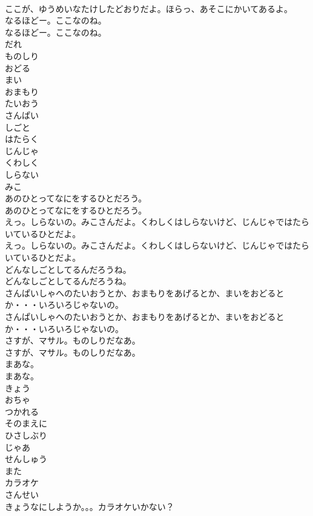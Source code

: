 \documentclass[8pt]{extreport}
\begin{document}
\begin{CJK}{UTF8}{min}
\\	ここが、ゆうめいなたけしたどおりだよ。ほらっ、あそこにかいてあるよ。
\\	なるほどー。ここなのね。
\\	なるほどー。ここなのね。
\\	だれ
\\	ものしり
\\	おどる
\\	まい
\\	おまもり
\\	たいおう
\\	さんぱい
\\	しごと
\\	はたらく
\\	じんじゃ
\\	くわしく
\\	しらない
\\	みこ
\\	あのひとってなにをするひとだろう。
\\	あのひとってなにをするひとだろう。
\\	えっ。しらないの。みこさんだよ。くわしくはしらないけど、じんじゃではたらいているひとだよ。
\\	えっ。しらないの。みこさんだよ。くわしくはしらないけど、じんじゃではたらいているひとだよ。
\\	どんなしごとしてるんだろうね。
\\	どんなしごとしてるんだろうね。
\\	さんぱいしゃへのたいおうとか、おまもりをあげるとか、まいをおどるとか・・・いろいろじゃないの。
\\	さんぱいしゃへのたいおうとか、おまもりをあげるとか、まいをおどるとか・・・いろいろじゃないの。
\\	さすが、マサル。ものしりだなあ。
\\	さすが、マサル。ものしりだなあ。
\\	まあな。
\\	まあな。
\\	きょう
\\	おちゃ
\\	つかれる
\\	そのまえに
\\	ひさしぶり
\\	じゃあ
\\	せんしゅう
\\	また
\\	カラオケ
\\	さんせい
\\	きょうなにしようか。。。カラオケいかない？

\end{CJK}
\end{document}
